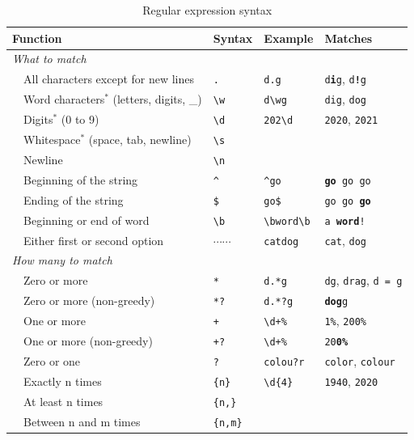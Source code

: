 
\newcommand{\ttt}[1]{\texttt{\small{#1}}}
\newcommand{\bs}[1]{\ttt{\textbackslash#1}}

\begin{table}
  \caption{\label{tab:regex}Regular expression syntax}{
  \begin{tabularx}{\textwidth}{lllll}
    \toprule
\multicolumn{2}{l}{Function}      & Syntax   & Example & Matches    \\
    \midrule
\multicolumn{2}{l}{\textit{What to match}} \\
& All characters except for new lines   & \ttt{.} & \ttt{d.g} & \ttt{d\textbf{i}g}, \ttt{d\textbf{!}g}\\
& Word characters$^*$
  (letters, digits, \_)         & \bs{w} & \ttt{d\textbackslash{}wg} & \ttt{dig}, \ttt{dog} \\
& Digits$^*$ (0 to 9)                       & \bs{d} & \ttt{202\textbackslash{}d} & \ttt{2020}, \ttt{2021} \\
& Whitespace$^*$ (space, tab, newline) & \bs{s} \\
& Newline	& \bs{n} & \\

& Beginning of the string	& \ttt{\^{}} & \ttt{\^{}go} & \ttt{\textbf{go} {\color{gray}go go}}\\
& Ending of the string   & \ttt{\$} & \ttt{go\$} & \ttt{{\color{gray}go go} \textbf{go}} \\
& Beginning or end of word & \bs{b} & \ttt{\textbackslash{}bword\textbackslash{}b} & \ttt{{\color{gray}a} \textbf{word}\color{gray}!} \\
& Either first or second option  & \ttt{$\cdots$\textbar$\cdots$} & \ttt{cat\textbar{}dog} & \ttt{cat}, \ttt{dog}\\

\multicolumn{2}{l}{\textit{How many to match}} \\
& Zero or more & \ttt{*} & \ttt{d.*g} & \ttt{dg}, \ttt{drag}, \ttt{d = g} \\
& Zero or more (non-greedy) & \ttt{*?} & \ttt{d.*?g} & \ttt{\textbf{dog}{\color{gray}g}} \\
& One or more & \ttt{+}  & \ttt{\textbackslash{}d+\%} & \ttt{1\%}, \ttt{200\%} \\
& One or more (non-greedy) & \ttt{+?}  & \ttt{\textbackslash{}d+\%} & \ttt{{\color{gray}20}\textbf{0\%}} \\
& Zero or one  & \ttt{?} & \ttt{colou?r} & \ttt{color}, \ttt{colour} \\
& Exactly n times  & \ttt{\{n\}} & \ttt{\textbackslash{}d{\{4\}}} & \ttt{1940}, \ttt{2020} \\
& At least n times  & \ttt{\{n,\}} \\
& Between n and m times  & \ttt{\{n,m\}} \\


\end{tabularx}}
\end{table}
